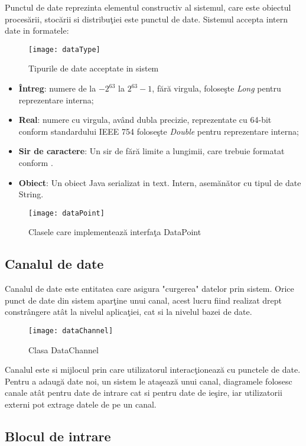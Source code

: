 Punctul de date reprezinta elementul constructiv al sistemul, care este obiectul procesării, stocării si distribuţiei este punctul de date. 
Sistemul accepta intern date in formatele: 
\begin{wrapfigure}{r}{0.38\textwidth}
	\centering
	\texttt{[image: dataType]}
	\caption{Tipurile de date acceptate in sistem}
\end{wrapfigure}
\begin{itemize}
	\item \textbf{Întreg}: numere de la $-2^{63}$ la $2^{63} -1$, fără virgula, foloseşte \textit{Long} pentru reprezentare interna;
	\item \textbf{Real}: numere cu virgula, având dubla precizie, reprezentate cu 64-bit conform standardului \autocite{4610935} IEEE 754  foloseşte \textit{Double} pentru reprezentare interna;
	\item \textbf{Sir de caractere}: Un sir de fără limite a lungimii, care trebuie formatat conform \autocite{rfc4627}. 
	\item \textbf{Obiect}: Un obiect Java serializat in text. Intern, asemănător cu tipul de date String. 
\end{itemize}

\begin{figure}[h]
	\centering
	\texttt{[image: dataPoint]}
	\caption{Clasele care implementează interfaţa DataPoint}
\end{figure}

\subsection{Canalul de date}

Canalul de date este entitatea care asigura "curgerea" datelor prin sistem. Orice punct de date din sistem aparţine unui canal, acest lucru fiind realizat drept constrângere atât la nivelul aplicaţiei, cat si la nivelul bazei de date.
\begin{figure}[h]
	\centering
	\texttt{[image: dataChannel]}
	\caption{Clasa DataChannel}
\end{figure}
Canalul este si mijlocul prin care utilizatorul interacţionează cu punctele de date. Pentru a adaugă date noi, un sistem le ataşează unui canal, diagramele folosesc canale atât pentru date de intrare cat si pentru date de ieşire, iar utilizatorii externi pot extrage datele de pe un canal.

\subsection{Blocul de intrare}

